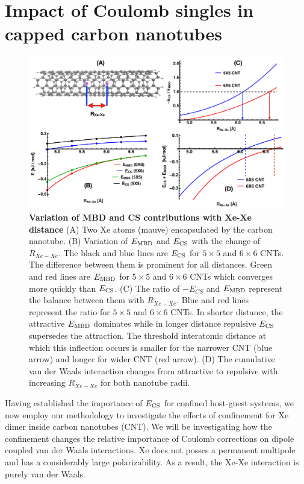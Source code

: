 \documentclass[aps,prl,groupaddress, twocolumn]{revtex4-1}  %
\begin{document}
\section*{Impact of Coulomb singles in capped carbon nanotubes}
\begin{figure}[hbtp]
\includegraphics[scale=0.5, width=\textwidth]{Plots/CNTplots.pdf}
\caption{\textbf{Variation of MBD and CS contributions with Xe-Xe distance} (A) Two Xe atoms (mauve) encapsulated by the carbon nanotube. (B) Variation of $E_{\rm MBD}$ and $E_{\rm CS}$ with the change of $R_{Xe-Xe}$. The black and blue lines are $E_{\rm CS}$ for $5 \times 5$ and $6 \times 6$ CNTs. The difference between them is prominent for all distances. Green and red lines are $E_{\rm MBD}$ for $5 \times 5$ and $6 \times 6$ CNTs which converges more quickly than $E_{\rm CS}$. (C) The ratio of $-E_{CS}$ and $E_{\rm MBD}$ represent the balance between them with $R_{Xe-Xe}$. Blue and red lines represent the ratio for $5\times5$ and $6\times6$ CNTs. In shorter distance, the attractive $E_{\rm MBD}$ dominates while in longer distance repulsive $E_{\rm CS}$ supersedes the attraction. The threshold interatomic distance at which this inflection occurs is smaller for the narrower CNT (blue arrow) and longer for wider CNT (red arrow). (D) The cumulative van der Waals interaction changes from attractive to repulsive with increasing $R_{Xe-Xe}$ for both nanotube radii.}\label{fig:CNT}
\end{figure}
Having established the importance of $E_{\rm CS}$ for confined host-guest systems, we now employ our methodology to investigate the effects of confinement for Xe dimer inside carbon nanotubes (CNT). We will be investigating how the confinement changes the relative importance of Coulomb corrections on dipole coupled van der Waals interactions. Xe does not posses a permanent multipole and has a considerably large polarizability. As a result, the Xe-Xe interaction is purely van der Waals.
\end{document}
